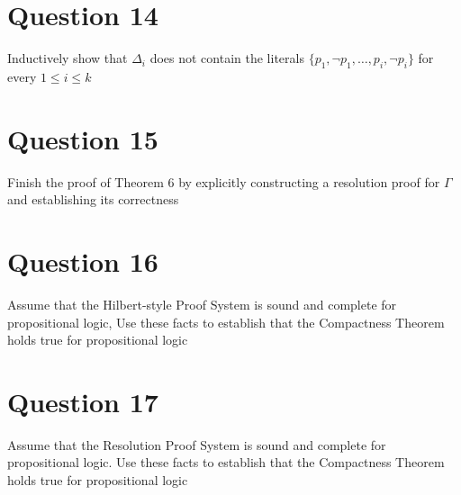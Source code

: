 \documentclass{article}
\begin{document}
\section*{Question 14}
Inductively show that $\Delta_i$ does not contain the literals $\{p_1, \neg p_1, \dots, p_i, \neg p_i\}$ for every $1 \le i \le k$

\section*{Question 15}
Finish the proof of Theorem 6 by explicitly constructing a resolution proof for $\Gamma$ and establishing its correctness

\section*{Question 16}
Assume that the Hilbert-style Proof System is sound and complete for propositional logic, Use these facts to establish that the Compactness Theorem holds true for propositional logic

\section*{Question 17}
Assume that the Resolution Proof System is sound and complete for propositional logic. Use these facts to establish that the Compactness Theorem holds true for propositional logic
\end{document}
